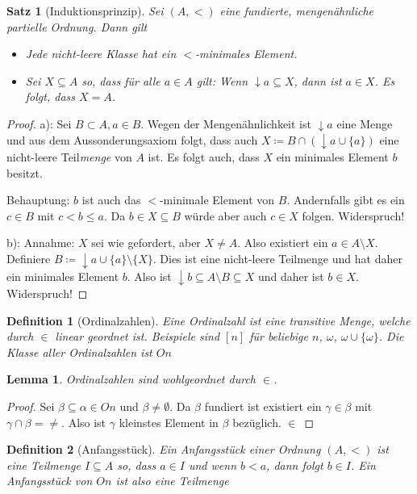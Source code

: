 \documentclass[german]{article}
\theoremstyle{break}
\theoremstyle{def_style}
\newtheorem{definition}{Definition}[section]
\theoremstyle{def_style}
\newtheorem{satz}{Satz}[section]
\theoremstyle{lemma_style}
\newtheorem{lemma}{Lemma}[subsection]
\begin{document}
\begin{satz}[Induktionsprinzip]
	Sei $(A,<)$ eine fundierte, mengenähnliche partielle Ordnung. Dann gilt
	\begin{itemize}
		\item[a)] Jede nicht-leere Klasse hat ein $<$-minimales Element.
		\item[b)] Sei $X\subseteq A$ so, dass für alle $a\in A$ gilt: Wenn $\downarrow a \subseteq X$, dann ist $a\in X$. Es folgt, dass $X=A$.
	\end{itemize}
\end{satz}
\begin{proof}
	a): Sei $B\subset A, a\in B$. Wegen der Mengenähnlichkeit ist $\downarrow a$ eine Menge und aus dem Aussonderungsaxiom folgt, dass auch $X\coloneqq B \cap (\downarrow a \cup \{a\})$ eine nicht-leere Teil\textit{menge} von $A$ ist. Es folgt auch, dass $X$ ein minimales Element $b$ besitzt. 
	
	Behauptung: $b$ ist auch das $<$-minimale Element von $B$. Andernfalls gibt es ein $c\in B$ mit $c < b \leq a$. Da $b\in X \subseteq B$ würde aber auch $c\in X$ folgen. Widerspruch!
	
	b): Annahme: $X$ sei wie gefordert, aber $X\neq A$. Also existiert ein $a\in A\setminus X$. Definiere $B\coloneqq \downarrow a \cup \{a\} \setminus \{X\}$. Dies ist eine nicht-leere Teilmenge und hat daher ein minimales Element $b$. Also ist $\downarrow b\subseteq A\setminus B\subseteq X$ und daher ist $b\in X$. Widerspruch!
\end{proof}

\begin{definition}[Ordinalzahlen]
	Eine \textit{Ordinalzahl} ist eine transitive Menge, welche durch $\in$ linear geordnet ist. 
	Beispiele sind $[n]$ für beliebige $n$, $\omega$, $\omega \cup \{\omega\}$. Die Klasse aller Ordinalzahlen ist $On$
\end{definition}

\begin{lemma}
	Ordinalzahlen sind wohlgeordnet durch $\in$.
\end{lemma}
\begin{proof}
	Sei $\beta\subseteq \alpha\in On$ und $\beta\neq \emptyset$. Da $\beta$ fundiert ist existiert ein $\gamma\in \beta$ mit $\gamma\cap \beta =\neq$. Also ist $\gamma$ kleinstes Element in $\beta$ bezüglich. $\in$
\end{proof}

\begin{definition}[Anfangsstück]
	Ein \textit{Anfangsstück} einer Ordnung $(A,<)$ ist eine Teilmenge $I\subseteq A$ so, dass $a\in I$ und wenn $b<a$, dann folgt $b\in I$. Ein Anfangsstück von $On$ ist also eine Teilmenge $$
\end{definition}
\end{document}
